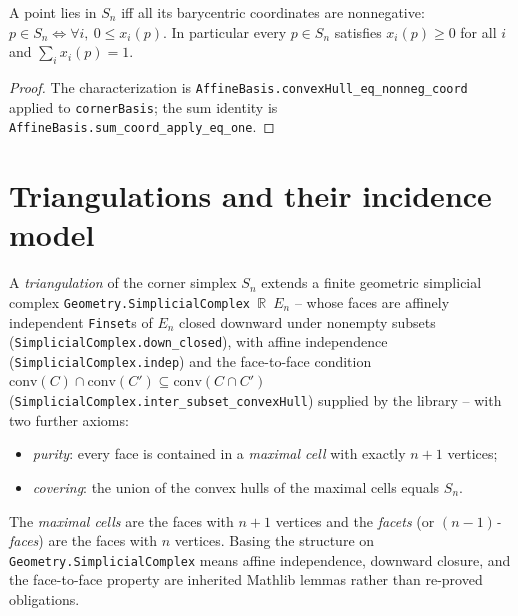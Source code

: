 \begin{lemma}
    \label{lem:mem-corner-simplex}
    A point lies in $S_n$ iff all its barycentric coordinates are nonnegative:
    $p \in S_n \iff \forall i,\ 0 \le x_i(p)$. In particular every $p \in S_n$
    satisfies $x_i(p) \ge 0$ for all $i$ and $\sum_i x_i(p) = 1$.
\end{lemma}
\begin{proof}
    The characterization is \texttt{AffineBasis.convexHull\_eq\_nonneg\_coord}
    applied to \texttt{cornerBasis}; the sum identity is
    \texttt{AffineBasis.sum\_coord\_apply\_eq\_one}.
\end{proof}

\section{Triangulations and their incidence model}

\begin{definition}[Triangulation]
    \label{def:triangulation}
    A \emph{triangulation} of the corner simplex $S_n$ extends a finite geometric
    simplicial complex \texttt{Geometry.SimplicialComplex $\mathbb R$ $E_n$} -- whose
    faces are affinely independent \texttt{Finset}s of $E_n$ closed downward under
    nonempty subsets (\texttt{SimplicialComplex.down\_closed}), with affine
    independence (\texttt{SimplicialComplex.indep}) and the face-to-face condition
    $\mathrm{conv}(C) \cap \mathrm{conv}(C') \subseteq \mathrm{conv}(C \cap C')$
    (\texttt{SimplicialComplex.inter\_subset\_convexHull}) supplied by the library
    -- with two further axioms:
    \begin{itemize}
        \item \emph{purity}: every face is contained in a \emph{maximal cell}
            with exactly $n+1$ vertices;
        \item \emph{covering}: the union of the convex hulls of the maximal cells
            equals $S_n$.
    \end{itemize}
    The \emph{maximal cells} are the faces with $n+1$ vertices and the
    \emph{facets} (or \emph{$(n-1)$-faces}) are the faces with $n$ vertices.
    Basing the structure on \texttt{Geometry.SimplicialComplex} means affine
    independence, downward closure, and the face-to-face property are inherited
    Mathlib lemmas rather than re-proved obligations.
\end{definition}


